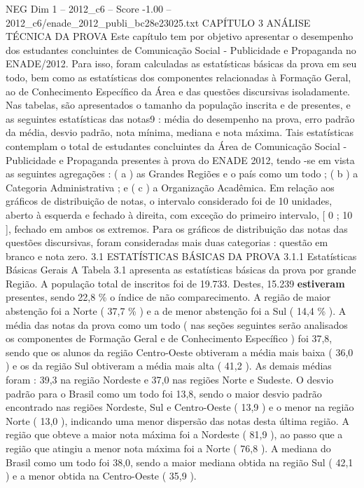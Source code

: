 \begin{textsample}{NEG Dim 1 – 2012\_c6 – Score -1.00 – 2012\_c6/enade\_2012\_publi\_bc28e23025.txt}  \label{ex:f1_neg_260}
CAPÍTULO 3 ANÁLISE TÉCNICA DA PROVA Este capítulo tem por objetivo apresentar o desempenho dos estudantes concluintes de Comunicação Social - Publicidade e Propaganda no ENADE/2012.
Para isso, foram calculadas as estatísticas básicas da prova em seu todo, bem como as estatísticas dos componentes relacionadas à Formação Geral, ao de Conhecimento Específico da Área e das questões discursivas isoladamente.
Nas tabelas, são apresentados o tamanho da população inscrita e de presentes, e as seguintes estatísticas das notas9 : média do desempenho na prova, erro padrão da média, desvio padrão, nota mínima, mediana e nota máxima.
Tais estatísticas contemplam o total de estudantes concluintes da Área de Comunicação Social - Publicidade e Propaganda presentes à prova do ENADE 2012, tendo -se em vista as seguintes agregações : ( a ) as Grandes Regiões e o país como um todo ; ( b ) a Categoria Administrativa ; e ( c ) a Organização Acadêmica.
Em relação aos gráficos de distribuição de notas, o intervalo considerado foi de 10 unidades, aberto à esquerda e fechado à direita, com exceção do primeiro intervalo, [ 0 ; 10 ], fechado em ambos os extremos.
Para os gráficos de distribuição das notas das questões discursivas, foram consideradas mais duas categorias : questão em branco e nota zero. 3.1 ESTATÍSTICAS BÁSICAS DA PROVA 3.1.1 Estatísticas Básicas Gerais A Tabela 3.1 apresenta as estatísticas básicas da prova por grande Região.
A população total de inscritos foi de 19.733.
Destes, 15.239 \textbf{estiveram} presentes, sendo 22,8 \% o índice de não comparecimento.
A região de maior abstenção foi a Norte ( 37,7 \% ) e a de menor abstenção foi a Sul ( 14,4 \% ).
A média das notas da prova como um todo ( nas seções seguintes serão analisados os componentes de Formação Geral e de Conhecimento Específico ) foi 37,8, sendo que os alunos da região Centro-Oeste obtiveram a média mais baixa ( 36,0 ) e os da região Sul obtiveram a média mais alta ( 41,2 ).
As demais médias foram : 39,3 na região Nordeste e 37,0 nas regiões Norte e Sudeste.
O desvio padrão para o Brasil como um todo foi 13,8, sendo o maior desvio padrão encontrado nas regiões Nordeste, Sul e Centro-Oeste ( 13,9 ) e o menor na região Norte ( 13,0 ), indicando uma menor dispersão das notas desta última região.
A região que obteve a maior nota máxima foi a Nordeste ( 81,9 ), ao passo que a região que atingiu a menor nota máxima foi a Norte ( 76,8 ).
A mediana do Brasil como um todo foi 38,0, sendo a maior mediana obtida na região Sul ( 42,1 ) e a menor obtida na Centro-Oeste ( 35,9 ).

\end{textsample}

